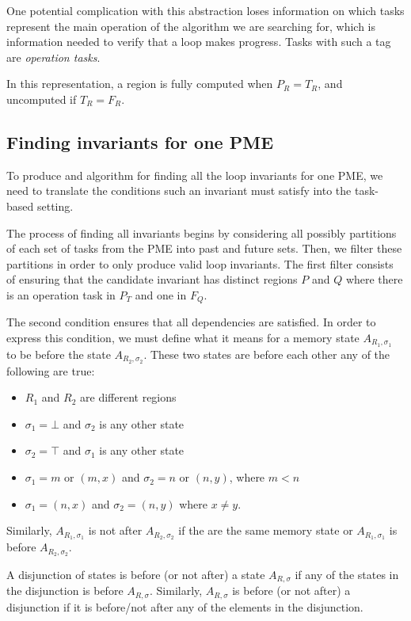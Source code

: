 \documentclass[12pt,letterpaper]{article}
\begin{document}
One potential complication with this abstraction loses information on which tasks represent the main operation of the algorithm we are searching for, which is information needed to verify that a loop makes progress.
Tasks with such a tag are \emph{operation tasks}.

In this representation, a region is fully computed when $P_R = T_R$, and uncomputed if $T_R = F_R$.

\subsection{Finding invariants for one PME}
To produce and algorithm for finding all the loop invariants for one PME, we need to translate the conditions such an invariant must satisfy into the task-based setting.

The process of finding all invariants begins by considering all possibly partitions of each set of tasks from the PME into past and future sets.
Then, we filter these partitions in order to only produce valid loop invariants.
The first filter consists of ensuring that the candidate invariant has distinct regions $P$ and $Q$ where there is an operation task in $P_T$ and one in $F_Q$.

The second condition ensures that all dependencies are satisfied.
In order to express this condition, we must define what it means for a memory state $A_{R_1, \sigma_1}$ to be before the state $A_{R_2, \sigma_2}$.
These two states are before each other any of the following are true:
\begin{itemize}
\item $R_1$ and $R_2$ are different regions
\item $\sigma_1 = \bot$ and $\sigma_2$ is any other state
\item $\sigma_2 = \top$ and $\sigma_1$ is any other state
\item $\sigma_1 = m$ or $(m, x)$ and $\sigma_2 = n$ or $(n, y)$, where $m < n$
\item $\sigma_1 = (n, x)$ and $\sigma_2 = (n, y)$ where $x \neq y$.
\end{itemize}
Similarly, $A_{R_1, \sigma_1}$ is not after $A_{R_2, \sigma_2}$ if the are the same memory state or $A_{R_1, \sigma_1}$ is before $A_{R_2, \sigma_2}$.

A disjunction of states is before (or not after) a state $A_{R, \sigma}$ if any of the states in the disjunction is before $A_{R, \sigma}$.
Similarly, $A_{R, \sigma}$ is before (or not after) a disjunction if it is before/not after any of the elements in the disjunction.
\end{document}
